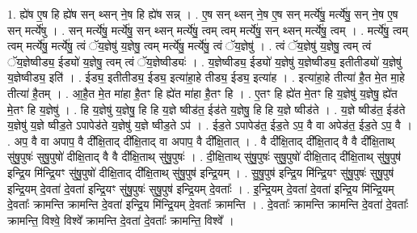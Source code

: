 \documentclass[17pt]{extarticle}
\begin{document}
1. ह्ये॑ष ए॒ष हि ह्ये॑ष सन् थ्सन् ने॒ष हि ह्ये॑ष सन्न् । . ए॒ष सन् थ्सन् ने॒ष ए॒ष सन् मर्त्ये॑षु॒ मर्त्ये॑षु॒ सन् ने॒ष ए॒ष सन् मर्त्ये॑षु । . सन् मर्त्ये॑षु॒ मर्त्ये॑षु॒ सन् थ्सन् मर्त्ये॑षु॒ त्वम् त्वम् मर्त्ये॑षु॒ सन् थ्सन् मर्त्ये॑षु॒ त्वम् । . मर्त्ये॑षु॒ त्वम् त्वम् मर्त्ये॑षु॒ मर्त्ये॑षु॒ त्वं ॅय॒ज्ञेषु॑ य॒ज्ञेषु॒ त्वम् मर्त्ये॑षु॒ मर्त्ये॑षु॒ त्वं ॅय॒ज्ञेषु॑ । . त्वं ॅय॒ज्ञेषु॑ य॒ज्ञेषु॒ त्वम् त्वं ॅय॒ज्ञेष्वीड्य॒ ईड्यो॑ य॒ज्ञेषु॒ त्वम् त्वं ॅय॒ज्ञेष्वीड्यः॑ । . य॒ज्ञेष्वीड्य॒ ईड्यो॑ य॒ज्ञेषु॑ य॒ज्ञेष्वीड्य॒ इतीतीड्यो॑ य॒ज्ञेषु॑ य॒ज्ञेष्वीड्य॒ इति॑ । . ईड्य॒ इतीतीड्य॒ ईड्य॒ इत्या॑हा॒हे तीड्य॒ ईड्य॒ इत्या॑ह । . इत्या॑हा॒हे तीत्या॑ है॒त मे॒त मा॒हे तीत्या॑ है॒तम् । . आ॒है॒त मे॒त मा॑हा है॒तꣳ हि ह्ये॑त मा॑हा है॒तꣳ हि । . ए॒तꣳ हि ह्ये॑त मे॒तꣳ हि य॒ज्ञेषु॑ य॒ज्ञेषु॒ ह्ये॑त मे॒तꣳ हि य॒ज्ञेषु॑ । . हि य॒ज्ञेषु॑ य॒ज्ञेषु॒ हि हि य॒ज्ञे ष्वीड॑त॒ ईड॑ते य॒ज्ञेषु॒ हि हि य॒ज्ञे ष्वीड॑ते । . य॒ज्ञे ष्वीड॑त॒ ईड॑ते य॒ज्ञेषु॑ य॒ज्ञे ष्वीड॒ते ऽपापेड॑ते य॒ज्ञेषु॑ य॒ज्ञे ष्वीड॒ते ऽप॑ । . ईड॒ते ऽपापेड॑त॒ ईड॒ते ऽप॒ वै वा अपेड॑त॒ ईड॒ते ऽप॒ वै । . अप॒ वै वा अपाप॒ वै दी᳚क्षि॒ताद् दी᳚क्षि॒ताद् वा अपाप॒ वै दी᳚क्षि॒तात् । . वै दी᳚क्षि॒ताद् दी᳚क्षि॒ताद् वै वै दी᳚क्षि॒ताथ् सु॑षु॒पुषः॑ सुषु॒पुषो॑ दीक्षि॒ताद् वै वै दी᳚क्षि॒ताथ् सु॑षु॒पुषः॑ । . दी॒क्षि॒ताथ् सु॑षु॒पुषः॑ सुषु॒पुषो॑ दीक्षि॒ताद् दी᳚क्षि॒ताथ् सु॑षु॒पुष॑ इन्द्रि॒य मि॑न्द्रि॒यꣳ सु॑षु॒पुषो॑ दीक्षि॒ताद् दी᳚क्षि॒ताथ् सु॑षु॒पुष॑ इन्द्रि॒यम् । . सु॒षु॒पुष॑ इन्द्रि॒य मि॑न्द्रि॒यꣳ सु॑षु॒पुषः॑ सुषु॒पुष॑ इन्द्रि॒यम् दे॒वता॑ दे॒वता॑ इन्द्रि॒यꣳ सु॑षु॒पुषः॑ सुषु॒पुष॑ इन्द्रि॒यम् दे॒वताः᳚ । . इ॒न्द्रि॒यम् दे॒वता॑ दे॒वता॑ इन्द्रि॒य मि॑न्द्रि॒यम् दे॒वताः᳚ क्रामन्ति क्रामन्ति दे॒वता॑ इन्द्रि॒य मि॑न्द्रि॒यम् दे॒वताः᳚ क्रामन्ति । . दे॒वताः᳚ क्रामन्ति क्रामन्ति दे॒वता॑ दे॒वताः᳚ क्रामन्ति॒ विश्वे॒ विश्वे᳚ क्रामन्ति दे॒वता॑ दे॒वताः᳚ क्रामन्ति॒ विश्वे᳚ । \newline
\end{document}
